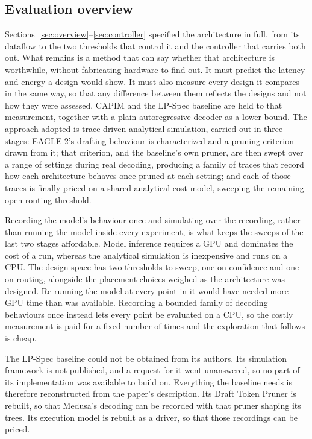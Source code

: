 \documentclass[11pt]{article}
\begin{document}
\subsection{Evaluation overview}
\label{sec:approach}
Sections~\ref{sec:overview}--\ref{sec:controller} specified the architecture in full, from its dataflow to the two thresholds that control it and the controller that carries both out. What remains is a method that can say whether that architecture is worthwhile, without fabricating hardware to find out. It must predict the latency and energy a design would show. It must also measure every design it compares in the same way, so that any difference between them reflects the designs and not how they were assessed. CAPIM and the LP-Spec baseline are held to that measurement, together with a plain autoregressive decoder as a lower bound. The approach adopted is trace-driven analytical simulation, carried out in three stages: EAGLE-2's drafting behaviour is characterized and a pruning criterion drawn from it; that criterion, and the baseline's own pruner, are then swept over a range of settings during real decoding, producing a family of traces that record how each architecture behaves once pruned at each setting; and each of those traces is finally priced on a shared analytical cost model, sweeping the remaining open routing threshold.

Recording the model's behaviour once and simulating over the recording, rather than running the model inside every experiment, is what keeps the sweeps of the last two stages affordable. Model inference requires a GPU and dominates the cost of a run, whereas the analytical simulation is inexpensive and runs on a CPU. The design space has two thresholds to sweep, one on confidence and one on routing, alongside the placement choices weighed as the architecture was designed. Re-running the model at every point in it would have needed more GPU time than was available. Recording a bounded family of decoding behaviours once instead lets every point be evaluated on a CPU, so the costly measurement is paid for a fixed number of times and the exploration that follows is cheap.

The LP-Spec baseline could not be obtained from its authors. Its simulation framework is not published, and a request for it went unanswered, so no part of its implementation was available to build on. Everything the baseline needs is therefore reconstructed from the paper's description. Its Draft Token Pruner is rebuilt, so that Medusa's decoding can be recorded with that pruner shaping its trees. Its execution model is rebuilt as a driver, so that those recordings can be priced.
\end{document}
